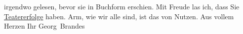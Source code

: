 \begin{ledgroupsized}[t]{13cm}
                    irgendwo gelesen, bevor sie in Buchform erschien. Mit Freude las ich, dass Sie
                        \uline{Teatererfolge} haben. Arm, wie wir alle sind,
                    ist das von Nutzen. Aus vollem Herzen\pend
           \pstart Ihr \spacefill\mbox{Georg Brandes}\pend{}\endnumbering{}\end{ledgroupsized}  \newcommand{\dateiname}{L02462}\newcommand{\titel}{Georg Brandes an Arthur Schnitzler, 30. 12. 1925}\newcommand{\editorInnen}{Martin Anton Müller und Gerd-Hermann Susen}
      